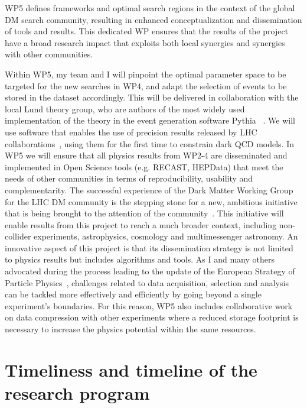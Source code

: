 \documentclass[11pt,a4paper]{article}
\begin{document}
WP5 defines frameworks and optimal search regions in the context of the global DM search community, resulting in enhanced conceptualization and dissemination of tools and results.
This dedicated WP ensures that the results of the project have a broad research impact that exploits both local synergies and synergies with other communities. 

Within WP5, my team and I will pinpoint the optimal parameter space to be targeted for the new searches in WP4, and adapt the selection of events to be stored in the dataset accordingly. 
This will be delivered in collaboration with the local Lund theory group, who are authors of the most widely used implementation of the theory in the event generation software Pythia ~\cite{Sjostrand:2007gs}. 
We will use software that enables the use of precision results released by LHC collaborations~\cite{Butterworth:2016sqg}, using them for the first time to constrain dark QCD models. 
In WP5 we will ensure that all physics results from WP2-4 are disseminated and implemented in Open Science tools (e.g. RECAST, HEPData) that meet the needs of other communities in terms of reproducibility, usability and complementarity. 
The successful experience of the Dark Matter Working Group for the LHC DM community is the stepping stone for a new, ambitious initiative that is being brought to the attention of the community~\cite{iDMEu}. 
This initiative will enable results from this project to reach a much broader context, including non-collider experiments, astrophysics, cosmology and multimessenger astronomy. 
An innovative aspect of this project is that its dissemination strategy is not limited to physics results but includes algorithms and tools. 
As I and many others advocated during the process leading to the update of the European Strategy of Particle Physics~\cite{Doglioni:2019fza}, challenges related to data acquisition, selection and analysis can be tackled more effectively and efficiently by going beyond a single experiment's boundaries. 
For this reason, WP5 also includes collaborative work on data compression with other experiments where a reduced storage footprint is necessary to increase the physics potential within the same resources. %

\section{Timeliness and timeline of the research program} 
\smallskip
\end{document}

